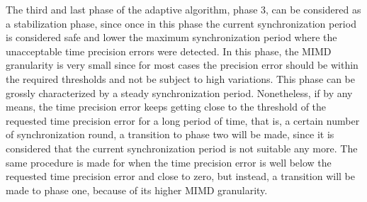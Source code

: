 The third and last phase of the adaptive algorithm, phase 3, can be considered as a stabilization phase, since once in this phase the current synchronization period is considered safe and lower the maximum synchronization period where the unacceptable time precision errors were detected. In this phase, the MIMD granularity is very small since for most cases the precision error should be within the required thresholds and not be subject to high variations. This phase can be grossly characterized by a steady synchronization period. Nonetheless, if by any means, the time precision error keeps getting close to the threshold of the requested time precision error for a long period of time, that is, a certain number of synchronization round, a transition to phase two will be made, since it is considered that the current synchronization period is not suitable any more. The same procedure is made for when the time precision error is well below the requested time precision error and close to zero, but instead, a transition will be made to phase one, because of its higher MIMD granularity.

